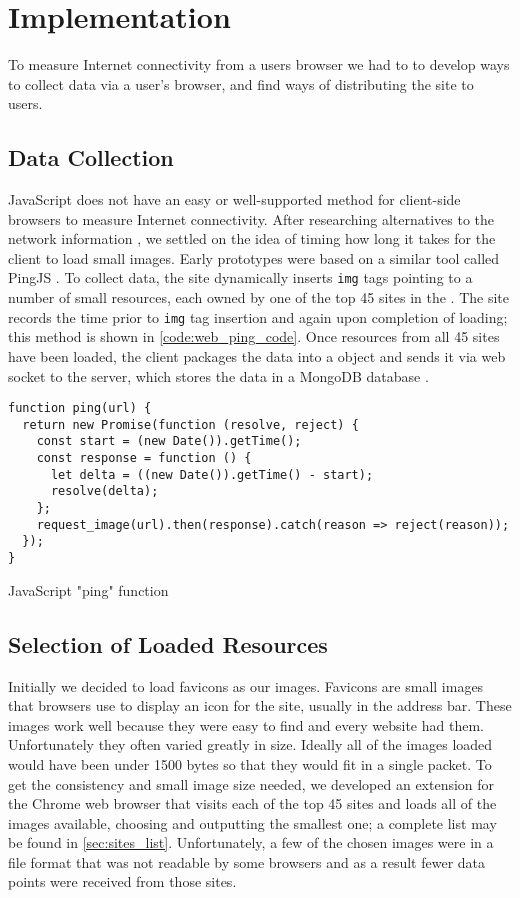 \section{Implementation}\label{sec:web_ping_impl}

To measure Internet connectivity from a users browser we had to to develop ways to collect data via a user's browser, and find ways of distributing the site to users.

\subsection{Data Collection}
JavaScript does not have an easy or well-supported method for client-side browsers to measure Internet connectivity. After researching alternatives to the network information \api, we settled on the idea of timing how long it takes for the client to load small images. Early prototypes were based on a similar tool called PingJS \cite{Frederic2016a}. To collect data, the site dynamically inserts \html \texttt{img} tags pointing to a number of small resources, each owned by one of the top 45 sites in the \us. The site records the time prior to \texttt{img} tag insertion and again upon completion of loading; this method is shown in \cref{code:web_ping_code}. Once resources from all 45 sites have been loaded, the client packages the data into a \json object and sends it via web socket to the server, which stores the data in a MongoDB database \cite{MongoDB2019a}. 

\begin{code}[htb]
    \centering
    \small
    \begin{verbatim}
function ping(url) {
  return new Promise(function (resolve, reject) {
    const start = (new Date()).getTime();
    const response = function () {
      let delta = ((new Date()).getTime() - start);
      resolve(delta);
    };
    request_image(url).then(response).catch(reason => reject(reason));
  });
}
    \end{verbatim}
    \caption{JavaScript "ping" function}
    \label{code:web_ping_code}
\end{code}


\subsection{Selection of Loaded Resources}
Initially we decided to load favicons as our images. Favicons are small images that browsers use to display an icon for the site, usually in the address bar. These images work well because they were easy to find and every website had them. Unfortunately they often varied greatly in size. Ideally all of the images loaded would have been under 1500 bytes so that they would fit in a single \tcp packet. To get the consistency and small image size needed, we developed an extension for the Chrome web browser that visits each of the top 45 sites and loads all of the images available, choosing and outputting the smallest one; a complete list may be found in \cref{sec:sites_list}. Unfortunately, a few of the chosen images were in a file format that was not readable by some browsers and as a result fewer data points were received from those sites.

